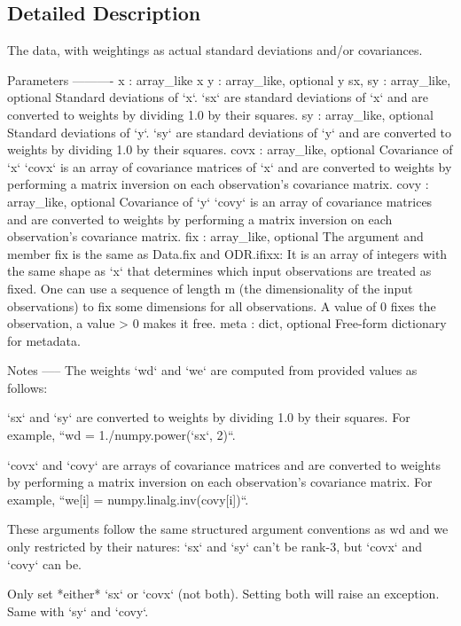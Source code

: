 \subsection{Detailed Description}
\begin{DoxyVerb}The data, with weightings as actual standard deviations and/or
covariances.

Parameters
----------
x : array_like
    x
y : array_like, optional
    y
sx, sy : array_like, optional
    Standard deviations of `x`.
    `sx` are standard deviations of `x` and are converted to weights by
     dividing 1.0 by their squares.
sy : array_like, optional
    Standard deviations of `y`.
    `sy` are standard deviations of `y` and are converted to weights by
    dividing 1.0 by their squares.
covx : array_like, optional
    Covariance of `x`
    `covx` is an array of covariance matrices of `x` and are converted to
    weights by performing a matrix inversion on each observation's
    covariance matrix.
covy : array_like, optional
    Covariance of `y`
    `covy` is an array of covariance matrices and are converted to
    weights by performing a matrix inversion on each observation's
    covariance matrix.
fix : array_like, optional
    The argument and member fix is the same as Data.fix and ODR.ifixx:
    It is an array of integers with the same shape as `x` that
    determines which input observations are treated as fixed. One can
    use a sequence of length m (the dimensionality of the input
    observations) to fix some dimensions for all observations. A value
    of 0 fixes the observation, a value > 0 makes it free.
meta : dict, optional
    Free-form dictionary for metadata.

Notes
-----
The weights `wd` and `we` are computed from provided values as follows:

`sx` and `sy` are converted to weights by dividing 1.0 by their squares.
For example, ``wd = 1./numpy.power(`sx`, 2)``.

`covx` and `covy` are arrays of covariance matrices and are converted to
weights by performing a matrix inversion on each observation's covariance
matrix.  For example, ``we[i] = numpy.linalg.inv(covy[i])``.

These arguments follow the same structured argument conventions as wd and
we only restricted by their natures: `sx` and `sy` can't be rank-3, but
`covx` and `covy` can be.

Only set *either* `sx` or `covx` (not both). Setting both will raise an
exception.  Same with `sy` and `covy`.\end{DoxyVerb}
 

